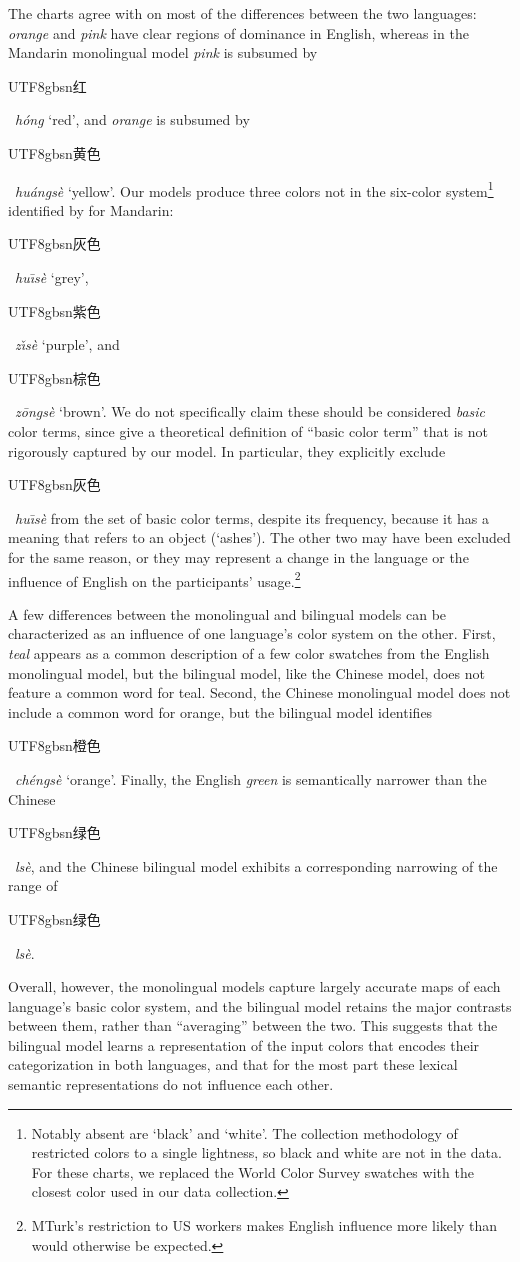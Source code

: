 \documentclass[11pt,a4paper]{article}
\newenvironment{zh}{\begin{CJK}{UTF8}{gbsn}}{\end{CJK}}
\newcommand{\textzh}[2]{\begin{zh}#1\end{zh}~\emph{#2}}
\renewcommand{\|}{\mid}
\begin{document}
The charts agree with \citet{BerlinKay1969} on most of the differences between the two languages:
\emph{orange} and \emph{pink} have clear regions of dominance in English, whereas in the Mandarin
monolingual model \emph{pink} is subsumed by \textzh{红}{h\'ong} `red', and \emph{orange} is subsumed by \textzh{黄色}{hu\'angs\`e} `yellow'. Our models produce three colors not in the six-color system\footnote{Notably absent are `black' and `white'. The collection methodology of \citet{Monroe2017} restricted colors to a single lightness, so black and white are not in the data. For these charts, we replaced the World Color Survey swatches with the closest color used in our data collection.} identified by \citeauthor{BerlinKay1969} for Mandarin: \textzh{灰色}{hu\={\i}s\`e} `grey', \textzh{紫色}{z\v{\i}s\`e} `purple', and \textzh{棕色}{z\=ongs\`e} `brown'. We do not specifically claim these should be considered \emph{basic} color terms, since \citeauthor{BerlinKay1969} give a theoretical definition of ``basic color term'' that is not rigorously captured by our model. In particular, they explicitly exclude \textzh{灰色}{hu\={\i}s\`e} from the set of basic color terms, despite its frequency, because it has a meaning that refers to an object (`ashes'). The other two may have been excluded for the same reason, or they may represent a change in the language or the influence of English on the participants' usage.\footnote{MTurk's restriction to US workers makes English influence more likely than would otherwise be expected.}

A few differences between the monolingual and bilingual models can be characterized as an influence of
one language's color system on the other. First, \emph{teal} appears as a common description of a few color 
swatches from the English monolingual model, but the bilingual model, like the Chinese model, does not feature 
a common word for teal. Second, the Chinese monolingual model does not include a common word for orange, but
the bilingual model identifies \textzh{橙色}{ch\'engs\`e} `orange'. Finally, the English 
\emph{green} is semantically narrower than the Chinese \textzh{绿色}{ls\`e}, and the
Chinese bilingual model exhibits a corresponding narrowing of the range of 
\textzh{绿色}{ls\`e}.

Overall, however, the monolingual models capture largely accurate maps of each language's
basic color system, and the bilingual model retains the major contrasts between them, 
rather than ``averaging'' between the two. This suggests that
the bilingual model learns a representation of the input colors that
encodes their categorization in both languages, and that for the most part these
lexical semantic representations do not influence each other.
\end{document}
